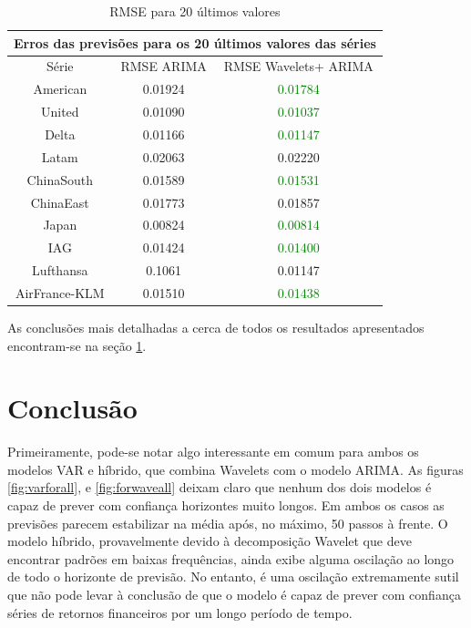 \documentclass[12pt]{article}
\begin{document}
	\begin{table}[H]\label{tab:RMSE_Wave_20}
		\centering
		
		\begin{tabular}{|c|c|c|}
			\hline
			\multicolumn{3}{|c|}{Erros das previsões para os 20 últimos valores das séries} \\ \hline
			Série                   & RMSE ARIMA           & RMSE Wavelets+ ARIMA           \\ \hline
			American                & 0.01924              & \textcolor{green}{0.01784}                        \\
			United                  & 0.01090              & \textcolor{green}{0.01037}                        \\
			Delta                   & 0.01166              & \textcolor{green}{0.01147}                        \\
			Latam                   & 0.02063              & 0.02220                        \\
			ChinaSouth              & 0.01589              & \textcolor{green}{0.01531}                        \\
			ChinaEast               & 0.01773              & 0.01857                        \\
			Japan                   & 0.00824              & \textcolor{green}{0.00814}                        \\
			IAG                     & 0.01424              & \textcolor{green}{0.01400}                        \\
			Lufthansa               & 0.1061               & 0.01147                        \\
			AirFrance-KLM           & 0.01510              & \textcolor{green}{0.01438}     \\ \hline                  
		\end{tabular}
	\caption{RMSE para 20 últimos valores}
	\end{table}

	As conclusões mais detalhadas a cerca de todos os resultados apresentados encontram-se na seção \ref{sec:conclusao}.
	
	\section{Conclusão}\label{sec:conclusao}
	
	Primeiramente, pode-se notar algo interessante em comum para ambos os modelos VAR e híbrido, que combina \textrm{Wavelets} com o modelo ARIMA. As figuras \ref{fig:varforall}, e \ref{fig:forwaveall} deixam claro que nenhum dos dois modelos é capaz de prever com confiança horizontes muito longos. Em ambos os casos as previsões parecem estabilizar na média após, no máximo, 50 passos à frente. O modelo híbrido, provavelmente devido à decomposição \textrm{Wavelet} que deve encontrar padrões em baixas frequências, ainda exibe alguma oscilação ao longo de todo o horizonte de previsão. No entanto, é uma oscilação extremamente sutil que não pode levar à conclusão de que o modelo é capaz de prever com confiança séries de retornos financeiros por um longo período de tempo.
	
\end{document}
